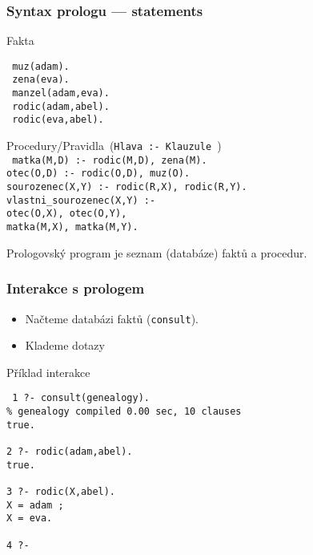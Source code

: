 \documentclass[red,professionalfont]{beamer}
\theoremstyle{definition}
\newcommand{\0}{\mbox{${\bf 0}$}}
\begin{document}
\begin{frame}[fragile]\frametitle{Syntax prologu --- statements}
\alert{Fakta}\pause
\begin{verbatim}
 muz(adam).
 zena(eva).
 manzel(adam,eva).
 rodic(adam,abel).
 rodic(eva,abel).
\end{verbatim}\pause
\alert{Procedury/Pravidla}\pause\ ({\tt Hlava :- Klauzule })\pause
\\
{\tt
 matka(M,D) :- rodic(M,D), zena(M).\\
 otec(O,D) :- rodic(O,D), muz(O).\pause\\
 sourozenec(X,Y) :- rodic(R,X), rodic(R,Y).\pause\\
 vlastni\_sourozenec(X,Y) :-\\
\hskip1cm       otec(O,X), otec(O,Y),\\
\hskip1cm       matka(M,X), matka(M,Y).\pause\\
}
\begin{block}{}
Prologovský program je seznam (databáze) faktů a procedur. 
\end{block}
\end{frame}

\begin{frame}[fragile]\frametitle{Interakce s prologem}
\begin{itemize}
 \item Načteme databázi faktů ({\tt consult}).\pause
 \item Klademe dotazy\pause
\end{itemize}
\begin{block}{}
 \begin{center}
  Příklad interakce
 \end{center}
\end{block}\pause
{\tt
1 ?-\pause\ consult(genealogy).\pause\\
\% genealogy compiled 0.00 sec, 10 clauses\\
true.\\
\
\\
2 ?-\pause\ rodic(adam,abel).\pause\\
true.\\
\
\\
3 ?-\pause\ rodic(X,abel).\pause\\
X = adam\pause\ ;\pause\\
X = eva.\\
\
\\
4 ?-
}
\end{frame}
\end{document}
